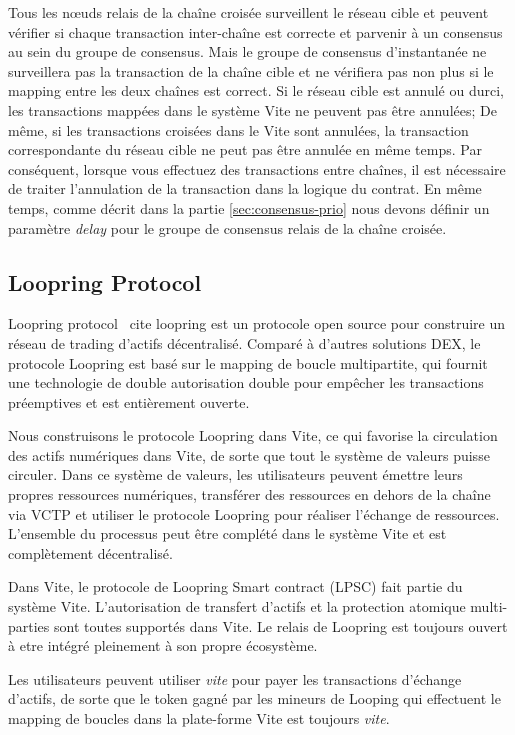 \documentclass[UTF8,nofonts]{article}
\begin{document}
\begin{multicols}{2}
Tous les nœuds relais de la chaîne croisée surveillent le réseau cible et peuvent vérifier si chaque transaction inter-chaîne est correcte et parvenir à un consensus au sein du groupe de consensus. Mais le groupe de consensus d'instantanée ne surveillera pas la transaction de la chaîne cible et ne vérifiera pas non plus si le mapping entre les deux chaînes est correct. 
Si le réseau cible est annulé ou durci, les transactions mappées dans le système Vite ne peuvent pas être annulées; De même, si les transactions croisées dans le Vite sont annulées, la transaction correspondante du réseau cible ne peut pas être annulée en même temps. Par conséquent, lorsque vous effectuez des transactions entre chaînes, il est nécessaire de traiter l'annulation de la transaction dans la logique du contrat. En même temps, comme décrit dans la partie \ref{sec:consensus-prio} nous devons définir un paramètre \textit{delay} pour le groupe de consensus relais de la chaîne croisée.

\subsection{Loopring Protocol}
Loopring protocol \ cite {loopring} est un protocole open source pour construire un réseau de trading d'actifs décentralisé. Comparé à d'autres solutions DEX, le protocole Loopring est basé sur le mapping de boucle multipartite, qui fournit une technologie de double autorisation double pour empêcher les transactions préemptives et est entièrement ouverte.

Nous construisons le protocole Loopring dans Vite, ce qui favorise la circulation des actifs numériques dans Vite, de sorte que tout le système de valeurs puisse circuler. Dans ce système de valeurs, les utilisateurs peuvent émettre leurs propres ressources numériques, transférer des ressources en dehors de la chaîne via VCTP et utiliser le protocole Loopring pour réaliser l'échange de ressources. L'ensemble du processus peut être complété dans le système Vite et est complètement décentralisé.

Dans Vite, le protocole de Loopring Smart contract (LPSC) fait partie du système Vite. L'autorisation de transfert d'actifs et la protection atomique multi-parties sont toutes supportés dans Vite. Le relais de Loopring est toujours ouvert à etre intégré pleinement à son propre écosystème.

Les utilisateurs peuvent utiliser \textit{vite} pour payer les transactions d'échange d'actifs, de sorte que le token gagné par les mineurs de Looping qui effectuent le mapping de boucles dans la plate-forme Vite est toujours \textit{vite}.



\end{multicols}
\end{document}
